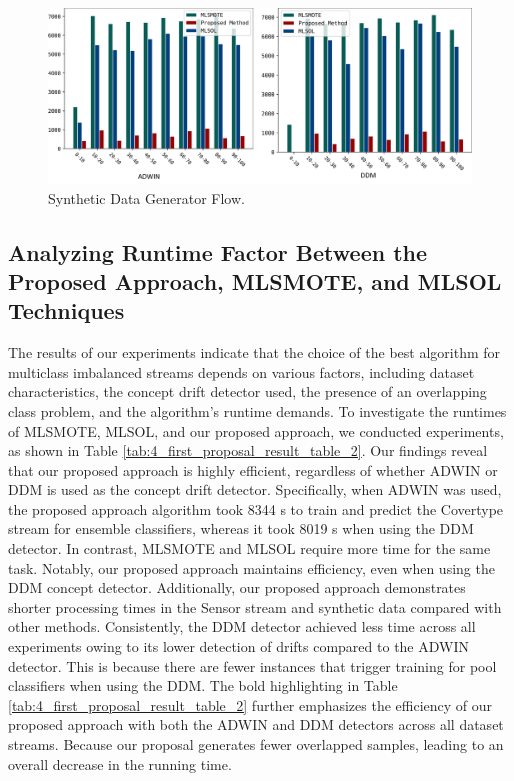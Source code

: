 \begin{figure}[!ht]
	\centering
	\includegraphics[width=1\linewidth]{4_Taxonomy/figures/exp_9.png}
	\caption{Synthetic Data Generator Flow.}
	\label{fig:4_first_proposal_result_exp_9}
\end{figure}

\subsection{Analyzing Runtime Factor Between the Proposed Approach, MLSMOTE, and MLSOL Techniques}
The results of our experiments indicate that the choice of the best algorithm for multiclass imbalanced streams depends on various factors, including dataset characteristics, the concept drift detector used, the presence of an overlapping class problem, and the algorithm's runtime demands. To investigate the runtimes of MLSMOTE, MLSOL, and our proposed approach, we conducted experiments, as shown in Table \ref{tab:4_first_proposal_result_table_2}. Our findings reveal that our proposed approach is highly efficient, regardless of whether ADWIN or DDM is used as the concept drift detector. Specifically, when ADWIN was used, the proposed approach algorithm took 8344 s to train and predict the Covertype stream for ensemble classifiers, whereas it took 8019 s when using the DDM detector. In contrast, MLSMOTE and MLSOL require more time for the same task. Notably, our proposed approach maintains efficiency, even when using the DDM concept detector. Additionally, our proposed approach demonstrates shorter processing times in the Sensor stream and synthetic data compared with other methods. Consistently, the DDM detector achieved less time across all experiments owing to its lower detection of drifts compared to the ADWIN detector. This is because there are fewer instances that trigger training for pool classifiers when using the DDM. The bold highlighting in Table \ref{tab:4_first_proposal_result_table_2} further emphasizes the efficiency of our proposed approach with both the ADWIN and DDM detectors across all dataset streams. Because our proposal generates fewer overlapped samples, leading to an overall decrease in the running time.

